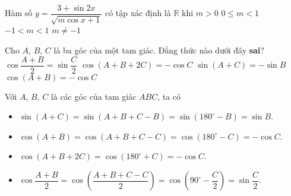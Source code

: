 \begin{ex}%
Hàm số $y=\dfrac{3+\sin 2x}{\sqrt{m\cos x+1}}$ có tập xác định là $\mathbb{R}$ khi
\choice
{$m>0$}
{$0 \leq m<1$}
{\True $-1<m<1$}
{$m \ne -1$}
\end{ex}

\begin{ex}%
Cho $A$, $B$, $C$ là ba góc của một tam giác. Đẳng thức nào dưới đây \textbf{sai}?
\choice
{$\cos \dfrac{A+B}{2}=\sin \dfrac{C}{2}$}
{$\cos (A+B+2C)=-\cos C$}
{\True $\sin (A+C)=-\sin B$}
{$\cos (A+B)=-\cos C$}
\loigiai
{
Với $A$, $B$, $C$ là các góc của tam giác $ABC$, ta có
\begin{itemize}
\item $\sin (A+C)=\sin(A+B+C-B) = \sin\left(180^\circ-B\right) = \sin B$.
\item $\cos (A+B)=\cos(A+B+C-C) = \cos\left(180^\circ-C\right) = -\cos C$.
\item $\cos (A+B+2C) = \cos\left(180^\circ+C\right)=-\cos C$.
\item $\cos \dfrac{A+B}{2} = \cos\left(\dfrac{A+B+C-C}{2}\right) = \cos\left(90^\circ-\dfrac{C}{2}\right)=\sin \dfrac{C}{2}$.
\end{itemize}
}
\end{ex}

